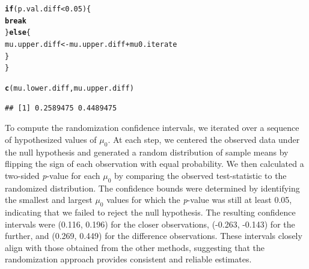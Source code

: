 \documentclass{article}\usepackage[]{graphicx}\usepackage[]{xcolor}
\makeatletter
\newcommand{\hlnum}[1]{\textcolor[rgb]{0.686,0.059,0.569}{#1}}%
\newcommand{\hlopt}[1]{\textcolor[rgb]{0,0,0}{#1}}%
\newcommand{\hldef}[1]{\textcolor[rgb]{0.345,0.345,0.345}{#1}}%
\newcommand{\hlkwa}[1]{\textcolor[rgb]{0.161,0.373,0.58}{\textbf{#1}}}%
\newcommand{\hlkwb}[1]{\textcolor[rgb]{0.69,0.353,0.396}{#1}}%
\newcommand{\hlkwd}[1]{\textcolor[rgb]{0.737,0.353,0.396}{\textbf{#1}}}%
\newenvironment{kframe}{%
 \def\at@end@of@kframe{}%
 \ifinner\ifhmode%
  \def\at@end@of@kframe{\end{minipage}}%
  \begin{minipage}{\columnwidth}%
 \fi\fi%
 \def\FrameCommand##1{\hskip\@totalleftmargin \hskip-\fboxsep
 \colorbox{shadecolor}{##1}\hskip-\fboxsep
     \hskip-\linewidth \hskip-\@totalleftmargin \hskip\columnwidth}%
 \MakeFramed {\advance\hsize-\width
   \@totalleftmargin\z@ \linewidth\hsize
   \@setminipage}}%
 {\par\unskip\endMakeFramed%
 \at@end@of@kframe}
\newenvironment{knitrout}{}{} %
\makeatother
\begin{document}
\begin{enumerate}
\begin{enumerate}
\begin{knitrout}
\begin{kframe}
\begin{alltt}
  \hlkwa{if}\hldef{(p.val.diff} \hlopt{<} \hlnum{0.05}\hldef{)\{}
    \hlkwa{break}
  \hldef{\}} \hlkwa{else} \hldef{\{}
    \hldef{mu.upper.diff} \hlkwb{<-} \hldef{mu.upper.diff} \hlopt{+} \hldef{mu0.iterate}
  \hldef{\}}
\hldef{\}}

\hlkwd{c}\hldef{(mu.lower.diff, mu.upper.diff)}
\end{alltt}
\begin{verbatim}
## [1] 0.2589475 0.4489475
\end{verbatim}
\end{kframe}
\end{knitrout}

To compute the randomization confidence intervals, we iterated over a sequence
of hypothesized values of $\mu_0$. At each step, we centered the observed data
under the null hypothesis and generated a random distribution of sample means by
flipping the sign of each observation with equal probability. We then calculated
a two-sided \emph{p}-value for each $\mu_0$ by comparing the observed test-statistic
to the randomized distribution. The confidence bounds were determined by identifying
the smallest and largest $\mu_0$ values for which the \emph{p}-value was still at
least 0.05, indicating that we failed to reject the null hypothesis. The resulting
confidence intervals were (0.116, 0.196) for the closer observations, (-0.263, -0.143)
for the further, and (0.269, 0.449) for the difference observations. These intervals
closely align with those obtained from the other methods, suggesting that the
randomization approach provides consistent and reliable estimates.
  

\end{enumerate}
\end{enumerate}
\end{document}
